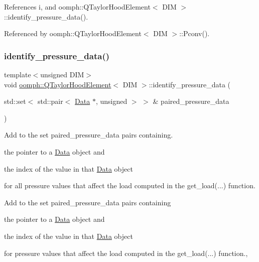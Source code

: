 References i, and oomph\+::\+Q\+Taylor\+Hood\+Element$<$ D\+I\+M $>$\+::identify\+\_\+pressure\+\_\+data().



Referenced by oomph\+::\+Q\+Taylor\+Hood\+Element$<$ D\+I\+M $>$\+::\+Pconv().

\mbox{\label{classoomph_1_1QTaylorHoodElement_ad1488e770c1364c5d6f25ce30532d9d4}} 
\subsubsection{\texorpdfstring{identify\+\_\+pressure\+\_\+data()}{identify\_pressure\_data()}}
{\footnotesize\ttfamily template$<$unsigned D\+IM$>$ \\
void \hyperlink{classoomph_1_1QTaylorHoodElement}{oomph\+::\+Q\+Taylor\+Hood\+Element}$<$ D\+IM $>$\+::identify\+\_\+pressure\+\_\+data (\begin{DoxyParamCaption}\item[{std\+::set$<$ std\+::pair$<$ \hyperlink{classoomph_1_1Data}{Data} $\ast$, unsigned $>$ $>$ \&}]{paired\+\_\+pressure\+\_\+data }\end{DoxyParamCaption})\hspace{0.3cm}{\ttfamily [virtual]}}



Add to the set {\ttfamily paired\+\_\+pressure\+\_\+data} pairs containing. 


\begin{DoxyItemize}
\item the pointer to a \hyperlink{classoomph_1_1Data}{Data} object and
\item the index of the value in that \hyperlink{classoomph_1_1Data}{Data} object
\end{DoxyItemize}for all pressure values that affect the load computed in the {\ttfamily get\+\_\+load}(...) function.

Add to the set {\ttfamily paired\+\_\+pressure\+\_\+data} pairs containing
\begin{DoxyItemize}
\item the pointer to a \hyperlink{classoomph_1_1Data}{Data} object and
\item the index of the value in that \hyperlink{classoomph_1_1Data}{Data} object
\end{DoxyItemize}for pressure values that affect the load computed in the {\ttfamily get\+\_\+load}(...) function., 

